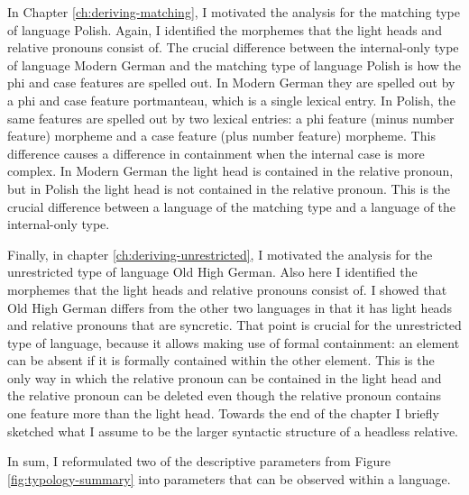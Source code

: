 In Chapter \ref{ch:deriving-matching}, I motivated the analysis for the matching type of language Polish. Again, I identified the morphemes that the light heads and relative pronouns consist of. The crucial difference between the internal-only type of language Modern German and the matching type of language Polish is how the phi and case features are spelled out. In Modern German they are spelled out by a phi and case feature portmanteau, which is a single lexical entry. In Polish, the same features are spelled out by two lexical entries: a phi feature (minus number feature) morpheme and a case feature (plus number feature) morpheme. This difference causes a difference in containment when the internal case is more complex. In Modern German the light head is contained in the relative pronoun, but in Polish the light head is not contained in the relative pronoun. This is the crucial difference between a language of the matching type and a language of the internal-only type.

Finally, in chapter \ref{ch:deriving-unrestricted}, I motivated the analysis for the unrestricted type of language Old High German. Also here I identified the morphemes that the light heads and relative pronouns consist of. I showed that Old High German differs from the other two languages in that it has light heads and relative pronouns that are syncretic. That point is crucial for the unrestricted type of language, because it allows making use of formal containment: an element can be absent if it is formally contained within the other element. This is the only way in which the relative pronoun can be contained in the light head and the relative pronoun can be deleted even though the relative pronoun contains one feature more than the light head. Towards the end of the chapter I briefly sketched what I assume to be the larger syntactic structure of a headless relative.

In sum, I reformulated two of the descriptive parameters from Figure \ref{fig:typology-summary} into parameters that can be observed within a language.

